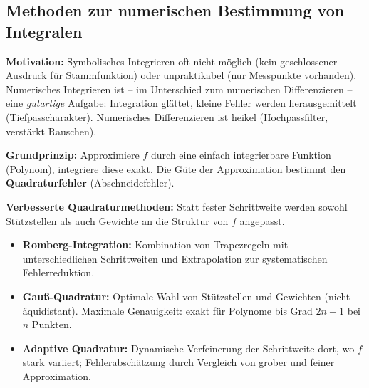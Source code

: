 \newpage

\subsection{Methoden zur numerischen Bestimmung von Integralen}

\textbf{Motivation:} Symbolisches Integrieren oft nicht möglich (kein geschlossener Ausdruck für Stammfunktion) oder unpraktikabel (nur Messpunkte vorhanden). Numerisches Integrieren ist -- im Unterschied zum numerischen Differenzieren -- eine \emph{gutartige} Aufgabe: Integration glättet, kleine Fehler werden herausgemittelt (Tiefpasscharakter). Numerisches Differenzieren ist heikel (Hochpassfilter, verstärkt Rauschen).

\textbf{Grundprinzip:} Approximiere $f$ durch eine einfach integrierbare Funktion (Polynom), integriere diese exakt. Die Güte der Approximation bestimmt den \textbf{Quadraturfehler} (Abschneidefehler).




\textbf{Verbesserte Quadraturmethoden:} Statt fester Schrittweite werden sowohl Stützstellen als auch Gewichte an die Struktur von $f$ angepasst.

\begin{itemize}[leftmargin=1.5em]
    \item \textbf{Romberg-Integration:} Kombination von Trapezregeln mit unterschiedlichen Schrittweiten und Extrapolation zur systematischen Fehlerreduktion.
    
    \item \textbf{Gauß-Quadratur:} Optimale Wahl von Stützstellen und Gewichten (nicht äquidistant). Maximale Genauigkeit: exakt für Polynome bis Grad $2n-1$ bei $n$ Punkten.
    
    \item \textbf{Adaptive Quadratur:} Dynamische Verfeinerung der Schrittweite dort, wo $f$ stark variiert; Fehlerabschätzung durch Vergleich von grober und feiner Approximation.
\end{itemize}

